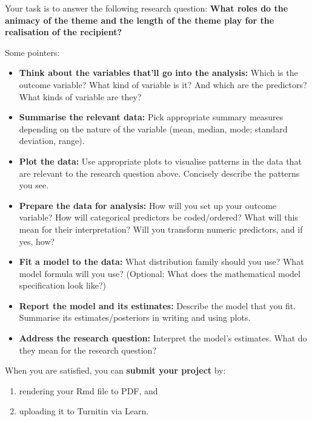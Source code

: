 \documentclass[
]{article}
\providecommand{\tightlist}{%
  \setlength{\itemsep}{0pt}\setlength{\parskip}{0pt}}
\begin{document}
Your task is to answer the following research question: \textbf{What
roles do the animacy of the theme and the length of the theme play for
the realisation of the recipient?}

Some pointers:

\begin{itemize}
\item
  \textbf{Think about the variables that'll go into the analysis:} Which
  is the outcome variable? What kind of variable is it? And which are
  the predictors? What kinds of variable are they?
\item
  \textbf{Summarise the relevant data:} Pick appropriate summary
  measures depending on the nature of the variable (mean, median, mode;
  standard deviation, range).
\item
  \textbf{Plot the data:} Use appropriate plots to visualise patterns in
  the data that are relevant to the research question above. Concisely
  describe the patterns you see.
\item
  \textbf{Prepare the data for analysis:} How will you set up your
  outcome variable? How will categorical predictors be coded/ordered?
  What will this mean for their interpretation? Will you transform
  numeric predictors, and if yes, how?
\item
  \textbf{Fit a model to the data:} What distribution family should you
  use? What model formula will you use? (Optional: What does the
  mathematical model specification look like?)
\item
  \textbf{Report the model and its estimates:} Describe the model that
  you fit. Summarise its estimates/posteriors in writing and using
  plots.
\item
  \textbf{Address the research question:} Interpret the model's
  estimates. What do they mean for the research question?
\end{itemize}

When you are satisfied, you can \textbf{submit your project} by:

\begin{enumerate}
\def\labelenumi{\arabic{enumi}.}
\tightlist
\item
  rendering your Rmd file to PDF, and
\item
  uploading it to Turnitin via Learn.
\end{enumerate}
\end{document}
